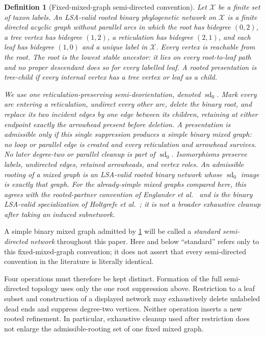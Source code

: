 \documentclass[11pt]{article}
\newtheorem{definition}[theorem]{Definition}
\theoremstyle{remark}
\newcommand{\Taxa}{\mathcal X}
\begin{document}
\begin{definition}[Fixed-mixed-graph semi-directed convention]\label{def:fixed-mixed}
Let $\Taxa$ be a finite set of taxon labels.  An \emph{LSA-valid rooted binary
phylogenetic network} on $\Taxa$ is a finite directed acyclic graph without
parallel arcs in which the root has bidegree $(0,2)$, a tree vertex has
bidegree $(1,2)$, a reticulation has bidegree $(2,1)$, and each leaf has
bidegree $(1,0)$ and a unique label in $\Taxa$.  Every vertex is reachable from
the root.  The root is the lowest stable ancestor: it lies on every
root-to-leaf path and no proper descendant does so for every labelled leaf.
A rooted presentation is \emph{tree-child} if every internal vertex has a
tree vertex or leaf as a child.

We use one reticulation-preserving semi-deorientation, denoted
$\operatorname{sd}_0$.  Mark every arc entering a reticulation, undirect every
other arc, delete the binary root, and replace its two incident edges by one
edge between its children, retaining at either endpoint exactly the
arrowhead present before deletion.  A presentation is admissible only if
this single suppression produces a simple binary mixed graph: no loop or
parallel edge is created and every reticulation and arrowhead survives.  No
later degree-two or parallel cleanup is part of $\operatorname{sd}_0$.
Isomorphisms preserve labels, undirected edges, retained arrowheads, and
vertex roles.  An \emph{admissible rooting} of a mixed graph is an LSA-valid
rooted binary network whose $\operatorname{sd}_0$ image is exactly that
graph.  For the already-simple mixed graphs compared here, this agrees with
the rooted-partner convention of Englander et
al.~\cite[Definitions~2.1--2.3]{EnglanderEtAl2026} and is the binary
LSA-valid specialization of Holtgrefe et al.~\cite{HoltgrefeEtAl2026}; it is
not a broader exhaustive cleanup after taking an induced subnetwork.
\end{definition}

A simple binary mixed graph admitted by \cref{def:fixed-mixed} will be called
a \emph{standard semi-directed network} throughout this paper.  Here and
below ``standard'' refers only to this fixed-mixed-graph convention; it does
not assert that every semi-directed convention in the literature is
literally identical.



Four operations must therefore be kept distinct.  Formation of the full
semi-directed topology uses only the one root suppression above.  Restriction
to a leaf subset and construction of a displayed network may exhaustively
delete unlabeled dead ends and suppress degree-two vertices.  Neither
operation inserts a new rooted refinement.  In particular, exhaustive
cleanup used after restriction does not enlarge the admissible-rooting set of
one fixed mixed graph.
\end{document}
